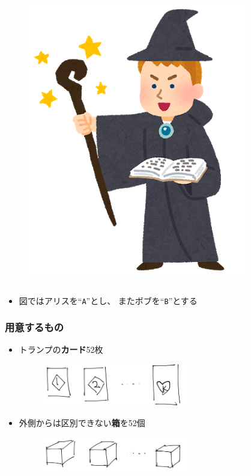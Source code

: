 \begin{frame}
\begin{columns}
\begin{column}{0.48\textwidth}
      \begin{figure}[h]
        \includegraphics[height=0.5\textheight]{img/bob.png}
      \end{figure}
    \end{column}
  \end{columns}

  \begin{itemize}
    \item 図ではアリスを``\texttt{A}''とし、
    またボブを``\texttt{B}''とする
  \end{itemize}
\end{frame}

\begin{frame}
  \frametitle{用意するもの}

  \pause
  \begin{itemize}
    \item<+-> トランプの\textbf{カード}52枚
    \begin{figure}[h]
      \includegraphics[width=0.6\textwidth]{img/cards.png}
    \end{figure}
   
    \item<+-> 外側からは区別できない\textbf{箱}を52個
    \begin{figure}[h]
      \includegraphics[width=0.6\textwidth]{img/boxes.png}
    \end{figure}
  \end{itemize}
\end{frame}

